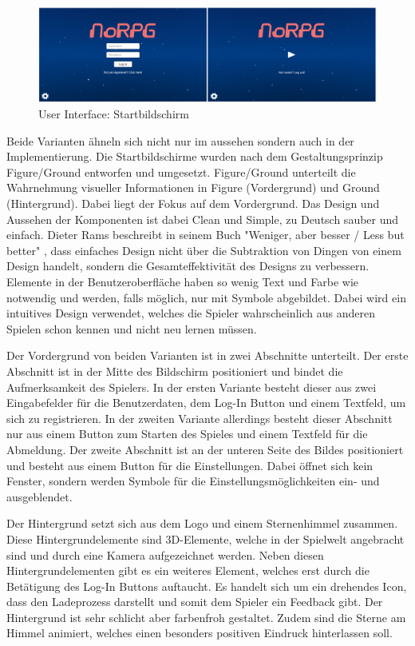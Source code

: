 				\begin{figure}[htbp]
					\centering 
					\label{startScreenUI}
					\includegraphics[width=\textwidth]{pics/startbildschirmeScreen.png}
					\caption{User Interface: Startbildschirm}
				\end{figure}

				Beide Varianten ähneln sich nicht nur im aussehen sondern auch in der Implementierung. Die Startbildschirme wurden nach dem Gestaltungsprinzip Figure/Ground entworfen und umgesetzt. Figure/Ground unterteilt die Wahrnehmung visueller Informationen in Figure (Vordergrund) und Ground (Hintergrund). Dabei liegt der Fokus auf dem Vordergrund. Das Design und Aussehen der Komponenten ist dabei Clean und Simple, zu Deutsch sauber und einfach. Dieter Rams beschreibt in seinem Buch "Weniger, aber besser / Less but better" \cite{ramsDesign}, dass einfaches Design nicht über die Subtraktion von Dingen von einem Design handelt, sondern die Gesamteffektivität des Designs zu verbessern. Elemente in der Benutzeroberfläche haben so wenig Text und Farbe wie notwendig und werden, falls möglich, nur mit Symbole abgebildet. Dabei wird ein intuitives Design verwendet, welches die Spieler wahrscheinlich aus anderen Spielen schon kennen und nicht neu lernen müssen.

				Der Vordergrund von beiden Varianten ist in zwei Abschnitte unterteilt. Der erste Abschnitt ist in der Mitte des Bildschirm positioniert und bindet die Aufmerksamkeit des Spielers. In der ersten Variante besteht dieser aus zwei Eingabefelder für die Benutzerdaten, dem Log-In Button und einem Textfeld, um sich zu registrieren. In der zweiten Variante allerdings besteht dieser Abschnitt nur aus einem Button zum Starten des Spieles und einem Textfeld für die Abmeldung. Der zweite Abschnitt ist an der unteren Seite des Bildes positioniert und besteht aus einem Button für die Einstellungen. Dabei öffnet sich kein Fenster, sondern werden Symbole für die Einstellungsmöglichkeiten ein- und ausgeblendet.

				Der Hintergrund setzt sich aus dem Logo und einem Sternenhimmel zusammen. Diese Hintergrundelemente sind 3D-Elemente, welche in der Spielwelt angebracht sind und durch eine Kamera aufgezeichnet werden. Neben diesen Hintergrundelementen gibt es ein weiteres Element, welches erst durch die Betätigung des Log-In Buttons auftaucht. Es handelt sich um ein drehendes Icon, dass den Ladeprozess darstellt und somit dem Spieler ein Feedback gibt. Der Hintergrund ist sehr schlicht aber farbenfroh gestaltet. Zudem sind die Sterne am Himmel animiert, welches einen besonders positiven Eindruck hinterlassen soll.

